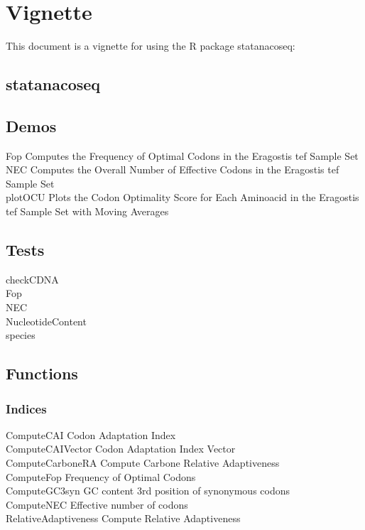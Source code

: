 \chapter{Vignette}
This document is a vignette for using the R package statanacoseq:


\section{statanacoseq}


\section{Demos}
Fop \quad Computes the Frequency of Optimal Codons in the Eragostis tef Sample Set \\
NEC \quad Computes the Overall Number of Effective Codons in the Eragostis tef Sample Set \\
plotOCU \quad Plots the Codon Optimality Score for Each Aminoacid in the Eragostis tef Sample Set with Moving Averages \\


\section{Tests}
checkCDNA \quad \\
Fop \quad \\
NEC \quad \\
NucleotideContent \quad \\
species \quad \\

\section{Functions}

\subsection{Indices}
ComputeCAI	\quad Codon Adaptation Index \\
ComputeCAIVector \quad 	Codon Adaptation Index Vector \\
ComputeCarboneRA	\quad Compute Carbone Relative Adaptiveness \\
ComputeFop	\quad Frequency of Optimal Codons \\
ComputeGC3syn	\quad GC content 3rd position of synonymous codons	 \\	%
ComputeNEC	\quad Effective number of codons \\							%
RelativeAdaptiveness	\quad Compute Relative Adaptiveness	 \\			%

